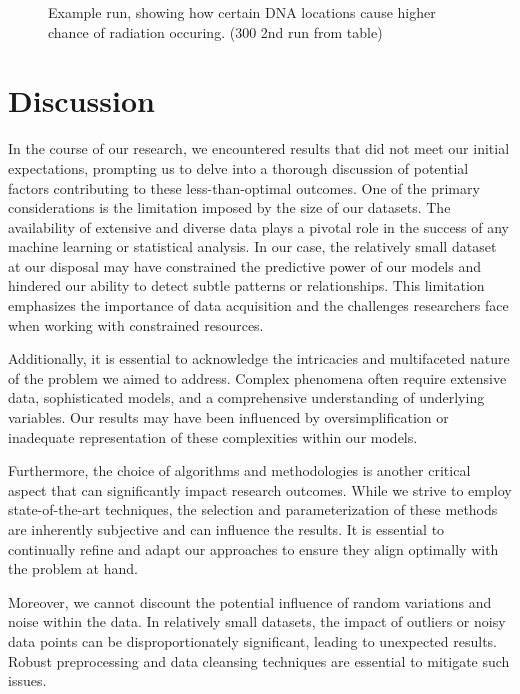 \documentclass{article}
\begin{document}
\null\newpage


\FloatBarrier
\begin{figure}[ht]
  \centering
  
  \caption{Example run, showing how certain DNA locations cause higher chance of radiation occuring. (300 2nd run from table)}
  \label{fig:your-pdf-figure}
\end{figure}

\null\newpage


\section{Discussion}

In the course of our research, we encountered results that did not meet our initial expectations, prompting us to delve into a thorough discussion of potential factors contributing to these less-than-optimal outcomes. One of the primary considerations is the limitation imposed by the size of our datasets. The availability of extensive and diverse data plays a pivotal role in the success of any machine learning or statistical analysis. In our case, the relatively small dataset at our disposal may have constrained the predictive power of our models and hindered our ability to detect subtle patterns or relationships. This limitation emphasizes the importance of data acquisition and the challenges researchers face when working with constrained resources.

Additionally, it is essential to acknowledge the intricacies and multifaceted nature of the problem we aimed to address. Complex phenomena often require extensive data, sophisticated models, and a comprehensive understanding of underlying variables. Our results may have been influenced by oversimplification or inadequate representation of these complexities within our models.

Furthermore, the choice of algorithms and methodologies is another critical aspect that can significantly impact research outcomes. While we strive to employ state-of-the-art techniques, the selection and parameterization of these methods are inherently subjective and can influence the results. It is essential to continually refine and adapt our approaches to ensure they align optimally with the problem at hand.

Moreover, we cannot discount the potential influence of random variations and noise within the data. In relatively small datasets, the impact of outliers or noisy data points can be disproportionately significant, leading to unexpected results. Robust preprocessing and data cleansing techniques are essential to mitigate such issues.
\end{document}
